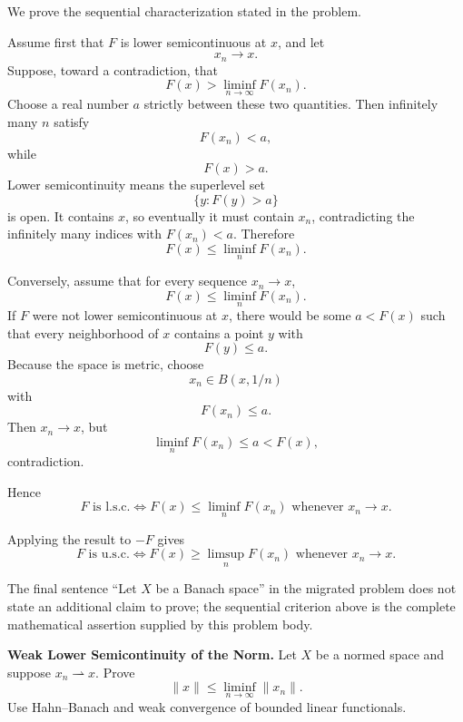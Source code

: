 \begin{solution}
We prove the sequential characterization stated in the problem.

Assume first that \(F\) is lower semicontinuous at \(x\), and let
\[
x_n\to x.
\]
Suppose, toward a contradiction, that
\[
F(x)>\liminf_{n\to\infty}F(x_n).
\]
Choose a real number \(a\) strictly between these two quantities. Then infinitely many \(n\) satisfy
\[
F(x_n)<a,
\]
while
\[
F(x)>a.
\]
Lower semicontinuity means the superlevel set
\[
\{y:F(y)>a\}
\]
is open. It contains \(x\), so eventually it must contain \(x_n\), contradicting the infinitely many indices with \(F(x_n)<a\). Therefore
\[
F(x)\le\liminf_nF(x_n).
\]

Conversely, assume that for every sequence \(x_n\to x\),
\[
F(x)\le\liminf_nF(x_n).
\]
If \(F\) were not lower semicontinuous at \(x\), there would be some \(a<F(x)\) such that every neighborhood of \(x\) contains a point \(y\) with
\[
F(y)\le a.
\]
Because the space is metric, choose
\[
x_n\in B(x,1/n)
\]
with
\[
F(x_n)\le a.
\]
Then \(x_n\to x\), but
\[
\liminf_nF(x_n)\le a<F(x),
\]
contradiction.

Hence
\[
\boxed{
F\text{ is l.s.c.}
\iff
F(x)\le\liminf_nF(x_n)
\text{ whenever }x_n\to x.
}
\]

Applying the result to \(-F\) gives
\[
\boxed{
F\text{ is u.s.c.}
\iff
F(x)\ge\limsup_nF(x_n)
\text{ whenever }x_n\to x.
}
\]

The final sentence ``Let \(X\) be a Banach space'' in the migrated problem does not state an additional claim to prove; the sequential criterion above is the complete mathematical assertion supplied by this problem body.
\end{solution}


\begin{problem}[CP-II-0282]
\label{prob:cp-ii-0282}
\textbf{Weak Lower Semicontinuity of the Norm.}
Let \(X\) be a normed space and suppose \(x_n\rightharpoonup x\). Prove
\[
\boxed{\|x\|\le\liminf_{n\to\infty}\|x_n\|.}
\]
Use Hahn--Banach and weak convergence of bounded linear functionals.
\end{problem}

